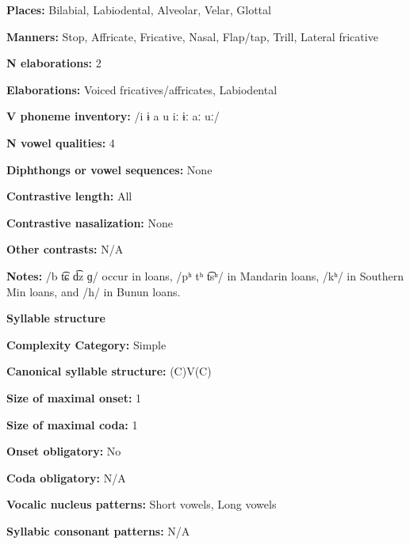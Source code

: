 \textbf{Places:} Bilabial, Labiodental, Alveolar, Velar, Glottal



\textbf{Manners:} Stop, Affricate, Fricative, Nasal, Flap/tap, Trill, Lateral fricative



\textbf{N elaborations:} 2



\textbf{Elaborations:} Voiced fricatives/affricates, Labiodental



\textbf{V phoneme inventory:} /i ɨ a u iː ɨː aː uː/



\textbf{N vowel qualities:} 4



\textbf{Diphthongs or vowel sequences:} None



\textbf{Contrastive length:} All



\textbf{Contrastive nasalization:} None



\textbf{Other contrasts:} N/A



\textbf{Notes:} /b t͡ɕ d͡z ɡ/ occur in  loans, /pʰ tʰ t͡sʰ/ in Mandarin loans, /kʰ/ in Southern Min loans, and /h/ in Bunun loans.



\textbf{Syllable structure}



\textbf{Complexity Category:} Simple



\textbf{Canonical syllable structure:} (C)V(C) \citep[32-33]{Pan2012}



\textbf{Size of maximal onset:} 1



\textbf{Size of maximal coda:} 1



\textbf{Onset obligatory:} No



\textbf{Coda obligatory:} N/A



\textbf{Vocalic nucleus patterns:} Short vowels, Long vowels



\textbf{Syllabic consonant patterns:} N/A



